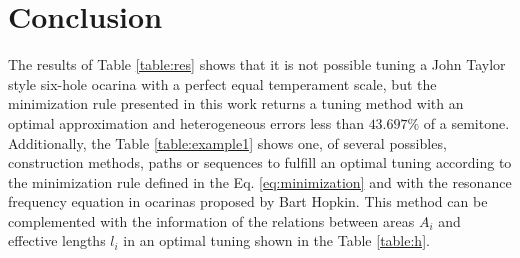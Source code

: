 \documentclass[11pt,twocolumn]{article}
\begin{document}
\begin{table}[h]
\center
{}
\caption{Proposed tuning method.}
\label{table:example1}
\end{table}


\section{Conclusion}
The results of Table \ref{table:res} shows that it is not possible tuning a John Taylor style six-hole ocarina with a perfect equal temperament scale,
but the minimization rule presented in this work returns a tuning method with an optimal approximation and heterogeneous errors less than $43.697\%$ of a semitone.
Additionally, the Table \ref{table:example1} shows one, of several possibles, construction methods, 
paths or sequences to fulfill an optimal tuning according to the minimization rule defined in the Eq. \ref{eq:minimization} and with 
the resonance frequency equation in ocarinas proposed by Bart Hopkin.
This method can be complemented with the information of the relations between areas $A_i$ and effective lengths $l_i$ 
in an optimal tuning shown in the Table \ref{table:h}.


\printbibliography


\end{document}
